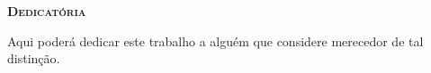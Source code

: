 
\vspace*{45pt}
\begin{flushleft}
	{\Large \textbf{\scshape{Dedicat\'{o}ria}}}
\end{flushleft}
\vspace*{10pt}

Aqui poderá dedicar este trabalho a alguém que considere merecedor de tal distinção.
